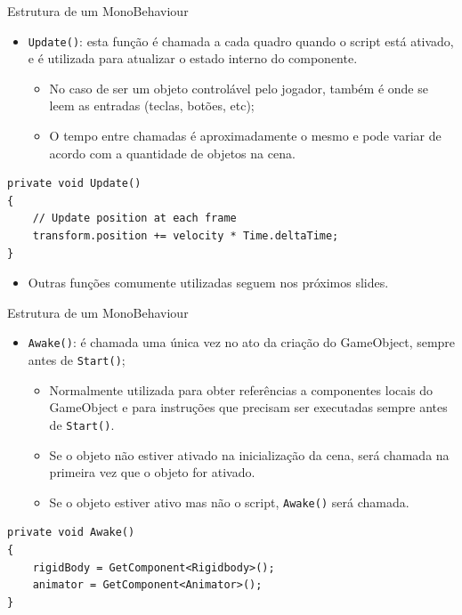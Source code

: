 \documentclass{beamer}
\begin{document}
\begin{frame}[fragile]{Estrutura de um MonoBehaviour}
	\begin{itemize}
		\item \verb|Update()|: esta função é chamada a cada quadro quando o script está ativado, e é utilizada para atualizar o estado interno do componente. 
		\begin{itemize}
			\item No caso de ser um objeto controlável pelo jogador, também é onde se leem as entradas (teclas, botões, etc);
			\item O tempo entre chamadas é aproximadamente o mesmo e pode variar de acordo com a quantidade de objetos na cena.
		\end{itemize}
	\end{itemize}
	\begin{lstlisting}
private void Update()
{
	// Update position at each frame
	transform.position += velocity * Time.deltaTime;
}
\end{lstlisting}
\begin{itemize}
	\item Outras funções comumente utilizadas seguem nos próximos slides.
\end{itemize}
\end{frame}

\begin{frame}[fragile]{Estrutura de um MonoBehaviour}
	\begin{itemize}
		\item \verb|Awake()|: é chamada uma única vez no ato da criação do GameObject, sempre antes de \verb|Start()|;
		\begin{itemize}
			\item Normalmente utilizada para obter referências a componentes locais do GameObject e para instruções que precisam ser executadas sempre antes de \verb|Start()|.
			\item Se o objeto não estiver ativado na inicialização da cena, será chamada na primeira vez que o objeto for ativado.
			\item Se o objeto estiver ativo mas não o script, \verb|Awake()| será chamada.
		\end{itemize}

	\end{itemize}
	\begin{lstlisting}
private void Awake()
{
	rigidBody = GetComponent<Rigidbody>();
	animator = GetComponent<Animator>();
}
	\end{lstlisting}
\end{frame}
\end{document}
